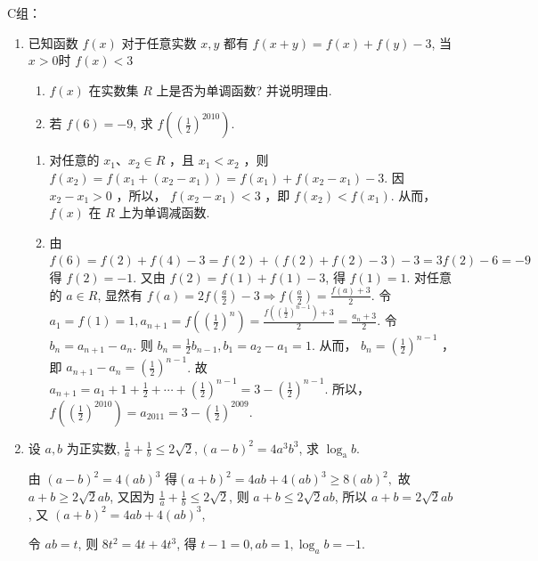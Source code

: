 C组：
\begin{enumerate}
    \item 已知函数 $f(x)$ 对于任意实数 $x, y$ 都有 $f(x+y)=f(x)+f(y)-3$, 当 $x>0$时 $f(x)<3$
    \begin{enumerate}
        \item $f(x)$ 在实数集 $R$ 上是否为单调函数? 并说明理由.
        \item 若 $f(6)=-9$, 求 $f\left(\left(\frac{1}{2}\right)^{2010}\right)$.
    \end{enumerate}
    \begin{jieda}
    \begin{enumerate}
        \item 对任意的 $x_1 、 x_2 \in R$ ，且 $x_1<x_2$ ，则 $f\left(x_2\right)=f\left(x_1+\left(x_2-x_1\right)\right)=f\left(x_1\right)+f\left(x_2-x_1\right)-3$.
因 $x_2-x_1>0$ ，所以， $f\left(x_2-x_1\right)<3$ ，即 $f\left(x_2\right)<f\left(x_1\right)$.
从而， $f(x)$ 在 $R$ 上为单调减函数.
\item 由 $f(6)=f(2)+f(4)-3=f(2)+(f(2)+f(2)-3)-3=3 f(2)-6=-9$得 $f(2)=-1$. 又由 $f(2)=f(1)+f(1)-3$, 得 $f(1)=1$.
对任意的 $a \in R$, 显然有 $f(a)=2 f\left(\frac{a}{2}\right)-3 \Rightarrow f\left(\frac{a}{2}\right)=\frac{f(a)+3}{2}$.
令 $a_1=f(1)=1, a_{n+1}=f\left(\left(\frac{1}{2}\right)^n\right)=\frac{f\left(\left(\frac{1}{2}\right)^{n-1}\right)+3}{2}=\frac{a_n+3}{2}$.
令 $b_n=a_{n+1}-a_n$. 则 $b_n=\frac{1}{2} b_{n-1}, b_1=a_2-a_1=1$.
从而， $b_n=\left(\frac{1}{2}\right)^{n-1}$ ，即 $a_{n+1}-a_n=\left(\frac{1}{2}\right)^{n-1}$.
故 $a_{n+1}=a_1+1+\frac{1}{2}+\cdots+\left(\frac{1}{2}\right)^{n-1}=3-\left(\frac{1}{2}\right)^{n-1}$.
所以， $f\left(\left(\frac{1}{2}\right)^{2010}\right)=a_{2011}=3-\left(\frac{1}{2}\right)^{2009}$.
    \end{enumerate}
    \end{jieda}

\item 设 $a, b$ 为正实数, $\frac{1}{a}+\frac{1}{b} \leq 2 \sqrt{2},(a-b)^2=4 a^3 b^3$, 求 $\log _{\mathrm{a}} b$.
\begin{jieda}
由 $(a-b)^2=4(a b)^3$ 得$(a+b)^2=4 a b+4(a b)^3 \geqslant 8(a b)^2,$
故 $a+b \geqslant 2 \sqrt{2} a b$,
又因为 $\frac{1}{a}+\frac{1}{b} \leqslant 2 \sqrt{2}$, 则 $a+b \leqslant 2 \sqrt{2} a b$,
所以 $a+b=2 \sqrt{2} a b$,
又 $(a+b)^2=4 a b+4(a b)^3$,

令 $a b=t$, 则 $8 t^2=4 t+4 t^3$, 得 $t-1=0, a b=1, \log _a b=-1$.

\end{jieda}
\end{enumerate}